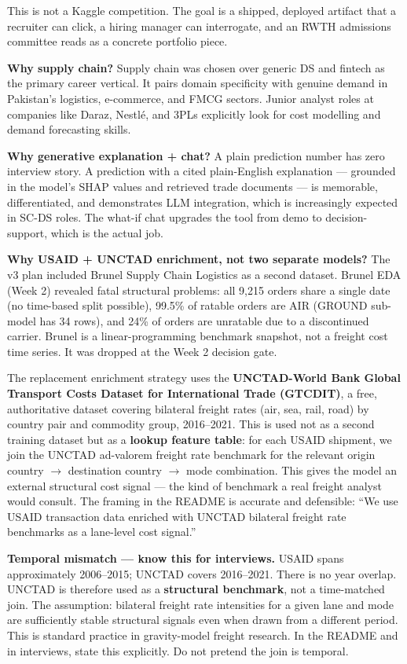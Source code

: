 \documentclass[11pt, a4paper]{article}
\begin{document}
This is not a Kaggle competition. The goal is a shipped, deployed artifact that a recruiter can click, a hiring manager can interrogate, and an RWTH admissions committee reads as a concrete portfolio piece.

\textbf{Why supply chain?} Supply chain was chosen over generic DS and fintech as the primary career vertical. It pairs domain specificity with genuine demand in Pakistan's logistics, e-commerce, and FMCG sectors. Junior analyst roles at companies like Daraz, Nestl\'{e}, and 3PLs explicitly look for cost modelling and demand forecasting skills.

\textbf{Why generative explanation + chat?} A plain prediction number has zero interview story. A prediction with a cited plain-English explanation --- grounded in the model's SHAP values and retrieved trade documents --- is memorable, differentiated, and demonstrates LLM integration, which is increasingly expected in SC-DS roles. The what-if chat upgrades the tool from demo to decision-support, which is the actual job.

\textbf{Why USAID + UNCTAD enrichment, not two separate models?} The v3 plan included Brunel Supply Chain Logistics as a second dataset. Brunel EDA (Week 2) revealed fatal structural problems: all 9,215 orders share a single date (no time-based split possible), 99.5\% of ratable orders are AIR (GROUND sub-model has 34 rows), and 24\% of orders are unratable due to a discontinued carrier. Brunel is a linear-programming benchmark snapshot, not a freight cost time series. It was dropped at the Week 2 decision gate.

The replacement enrichment strategy uses the \textbf{UNCTAD-World Bank Global Transport Costs Dataset for International Trade (GTCDIT)}, a free, authoritative dataset covering bilateral freight rates (air, sea, rail, road) by country pair and commodity group, 2016--2021. This is used not as a second training dataset but as a \textbf{lookup feature table}: for each USAID shipment, we join the UNCTAD ad-valorem freight rate benchmark for the relevant origin country $\rightarrow$ destination country $\rightarrow$ mode combination. This gives the model an external structural cost signal --- the kind of benchmark a real freight analyst would consult. The framing in the README is accurate and defensible: ``We use USAID transaction data enriched with UNCTAD bilateral freight rate benchmarks as a lane-level cost signal.''

\begin{warnbox}
\textbf{Temporal mismatch --- know this for interviews.} USAID spans approximately 2006--2015; UNCTAD covers 2016--2021. There is no year overlap. UNCTAD is therefore used as a \textbf{structural benchmark}, not a time-matched join. The assumption: bilateral freight rate intensities for a given lane and mode are sufficiently stable structural signals even when drawn from a different period. This is standard practice in gravity-model freight research. In the README and in interviews, state this explicitly. Do not pretend the join is temporal.
\end{warnbox}
\end{document}
